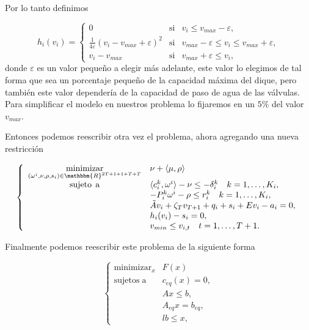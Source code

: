 \documentclass[a4paper,12pt]{report}
\newcommand{\la}{\langle}
\newcommand{\ra}{\rangle}
\newcommand{\RR}{\mathbbm{R}}
\newcommand{\vep}{\varepsilon}
\newcommand{\om}{\omega}
\begin{document}
Por lo tanto definimos

\begin{equation}
h_i(v_i)=\left\{
\begin{array}{ccc}
0 & \mbox{si} & v_i\leq v_{max}-\vep,\\
\frac{1}{4\vep}(v_i-v_{max}+\vep)^2 & \mbox{si} & v_{max}-\vep\leq v_i\leq v_{max}+\vep,\\
v_i - v_{max} & \mbox{si} & v_{max}+\vep \leq v_i,
\end{array}\right.
\end{equation}
donde $\vep$ es un valor peque\~no a elegir m\'as adelante, este valor lo elegimos de tal forma que sea un porcentaje peque\~no de la capacidad m\'axima del dique, pero tambi\'en este valor depender\'ia de la capacidad de paso de agua de las v\'alvulas. Para simplificar el modelo en nuestros problema lo fijaremos en un $5\%$ del valor $v_{max}$.

Entonces podemos reescribir otra vez el problema, ahora agregando una nueva restricci\'on


\begin{equation}\label{problemahidro2}
\left\{  
\begin{array}{cl}
\displaystyle\mathop{\mathrm{minimizar}}_{(\om^i,\nu,\rho,s_i)\in\RR^{2T+1+1+T+T}}&\nu+\la\mu,\rho\ra\\
  \mathrm{sujeto\, \;a}& \la c_i^k,\om^i\ra-\nu\leq -\delta_i^k \quad k=1,\ldots,K_i,\\
  	&	-P_i^k\om^i-\rho\leq r_i^k\quad k=1,\ldots,K_i,\\
  	&	\tilde{A}v_i+\zeta_T v_{T+1}+q_i+s_i+Ev_i-a_i=0,\\
	&	h_i(v_i)-s_i=0,\\
	&	v_{min}\leq v_{i,t}\quad t=1,\ldots,T+1.
 \end{array}
\right.
\end{equation}

Finalmente podemos reescribir este problema de la siguiente forma

\begin{equation}\label{problemahidro3}
\left\{
\begin{array}{rl}
\displaystyle\mathop{\mathrm{minimizar}}_{x}&F(x)\\
  \mathrm{sujetos\;a}& c_{eq}(x)=0,\\
  	&	Ax\leq b,\\
  	&	A_{eq} x= b_{eq},\\
	&  lb\leq x,
 \end{array}
\right.
\end{equation}
\end{document}
